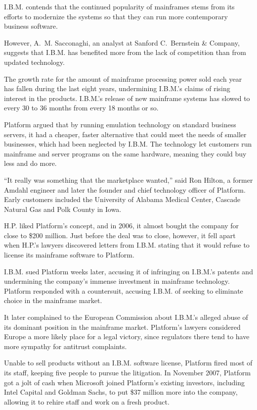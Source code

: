 \documentclass[12pt,a4paper,onecolumn]{article}
\begin{document}
\begin{CJK*}{GBK}{song}
I.B.M. contends that the continued popularity of mainframes stems from its efforts to modernize the
systems so that they can run more contemporary business software.

However, A.~M. Sacconaghi, an analyst at Sanford C.~Bernstein \& Company, suggests that I.B.M. has
benefited more from the lack of competition than from updated technology.

The growth rate for the amount of mainframe processing power sold each year has fallen during the
last eight years, undermining I.B.M.'s claims of rising interest in the products. I.B.M.'s release
of new mainframe systems has slowed to every 30 to 36 months from every 18 months or so.

Platform argued that by running emulation technology on standard business servers, it had a cheaper,
faster alternative that could meet the needs of smaller businesses, which had been neglected by
I.B.M. The technology let customers run mainframe and server programs on the same hardware, meaning
they could buy less and do more.

``It really was something that the marketplace wanted,'' said Ron Hilton, a former Amdahl engineer
and later the founder and chief technology officer of Platform. Early customers included the
University of Alabama Medical Center, Cascade Natural Gas and Polk County in Iowa.

H.P. liked Platform's concept, and in 2006, it almost bought the company for close to \$200 million.
Just before the deal was to close, however, it fell apart when H.P.'s lawyers discovered letters
from I.B.M. stating that it would refuse to license its mainframe software to Platform.

I.B.M. sued Platform weeks later, accusing it of infringing on I.B.M.'s patents and undermining the
company's immense investment in mainframe technology. Platform responded with a countersuit,
accusing I.B.M. of seeking to eliminate choice in the mainframe market.

It later complained to the European Commission about I.B.M.'s alleged abuse of its dominant position
in the mainframe market. Platform's lawyers considered Europe a more likely place for a legal
victory, since regulators there tend to have more sympathy for antitrust complaints.

Unable to sell products without an I.B.M. software license, Platform fired most of its staff,
keeping five people to pursue the litigation. In November 2007, Platform got a jolt of cash when
Microsoft joined Platform's existing investors, including Intel Capital and Goldman Sachs, to put
\$37 million more into the company, allowing it to rehire staff and work on a fresh product.


\end{CJK*}
\end{document}
